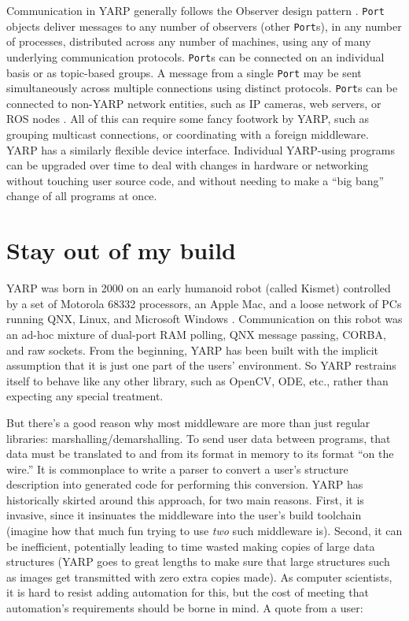 \documentclass[letterpaper]{article}
\begin{document}
Communication in YARP generally follows the Observer design pattern
\cite{gamma95design}. {\tt Port} objects deliver messages to any
number of observers (other {\tt Port}s), in any number of processes,
distributed across any number of machines, using any of many
underlying communication protocols.  {\tt Port}s can be connected on
an individual basis or as topic-based groups.  A message from a single
{\tt Port} may be sent simultaneously across multiple connections
using distinct protocols.  {\tt Port}s can be connected to non-YARP
network entities, such as IP cameras, web servers, or ROS nodes
\cite{quigley2009ros}.
All of this can require some fancy footwork by YARP, such as
grouping multicast connections, or coordinating with a foreign
middleware.  YARP has a similarly flexible device interface.  
Individual YARP-using programs can be upgraded
over time to deal with changes in hardware or networking without
touching user source code, and without needing to make a ``big bang''
change of all programs at once.


\section{Stay out of my build}

YARP was born in 2000 on an early humanoid robot (called Kismet)
controlled by a set of Motorola 68332 processors, an Apple Mac, and a
loose network of PCs running QNX, Linux, and Microsoft Windows
\cite{metta06yarp}.  Communication on this robot was an ad-hoc
mixture of dual-port RAM polling, QNX message passing, CORBA, and raw
sockets.  From the beginning, YARP has been built with the implicit
assumption that it is just one part of the users' environment.  So
YARP restrains itself to behave like any other library, such as
OpenCV, ODE, etc., rather than expecting any special treatment.

But there's a good reason why most middleware are more than just
regular libraries: marshalling/demarshalling.  To send
user data between programs, that data must be translated to and from
its format in memory to its format ``on the
wire.''  It is commonplace to write a parser to convert a user's
structure description into generated code for performing this
conversion.
YARP has historically skirted around this approach, for two main
reasons.  First, it is invasive, since it insinuates the middleware
into the user's build toolchain (imagine how that much fun trying to
use {\it two} such middleware is).  Second, it can be inefficient,
potentially leading to time wasted making copies of large data structures
(YARP goes to great lengths to make sure that large structures such as
images get transmitted with zero extra copies made).  As computer
scientists, it is hard to resist adding automation for this, 
but the cost of meeting that automation's requirements should be borne 
in mind.  A quote from a user:
\end{document}
